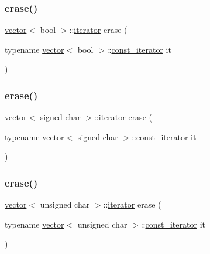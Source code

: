 \subsubsection{\texorpdfstring{erase()}{erase()}\hspace{0.1cm}{\footnotesize\ttfamily [3/28]}}
{\footnotesize\ttfamily \mbox{\hyperlink{classvector}{vector}}$<$ bool $>$\+::\mbox{\hyperlink{classvector_a35c955cacac6aacaa1e82874b1628865}{iterator}} erase (\begin{DoxyParamCaption}\item[{typename \mbox{\hyperlink{classvector}{vector}}$<$ bool $>$\+::\mbox{\hyperlink{classvector_a2fc97dce62b7053449cc868607540dba}{const\+\_\+iterator}}}]{it }\end{DoxyParamCaption})}

\mbox{\label{classvector_a67947ba7e1f06bd38647fc57735a2ca8}} 
\subsubsection{\texorpdfstring{erase()}{erase()}\hspace{0.1cm}{\footnotesize\ttfamily [4/28]}}
{\footnotesize\ttfamily \mbox{\hyperlink{classvector}{vector}}$<$ signed char $>$\+::\mbox{\hyperlink{classvector_a35c955cacac6aacaa1e82874b1628865}{iterator}} erase (\begin{DoxyParamCaption}\item[{typename \mbox{\hyperlink{classvector}{vector}}$<$ signed char $>$\+::\mbox{\hyperlink{classvector_a2fc97dce62b7053449cc868607540dba}{const\+\_\+iterator}}}]{it }\end{DoxyParamCaption})}

\mbox{\label{classvector_aacf2fa7c57cf08dba49138da45d9a338}} 
\subsubsection{\texorpdfstring{erase()}{erase()}\hspace{0.1cm}{\footnotesize\ttfamily [5/28]}}
{\footnotesize\ttfamily \mbox{\hyperlink{classvector}{vector}}$<$ unsigned char $>$\+::\mbox{\hyperlink{classvector_a35c955cacac6aacaa1e82874b1628865}{iterator}} erase (\begin{DoxyParamCaption}\item[{typename \mbox{\hyperlink{classvector}{vector}}$<$ unsigned char $>$\+::\mbox{\hyperlink{classvector_a2fc97dce62b7053449cc868607540dba}{const\+\_\+iterator}}}]{it }\end{DoxyParamCaption})}

